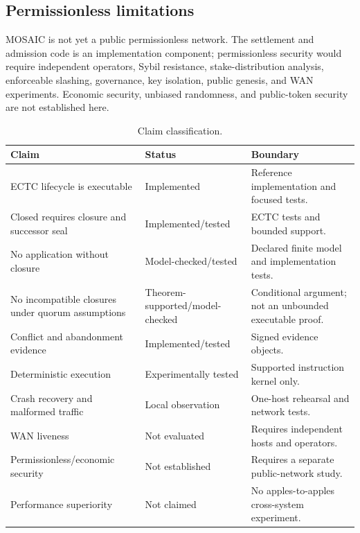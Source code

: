 \documentclass{ledger}
\begin{document}
\subsection{Permissionless limitations}
MOSAIC is not yet a public permissionless network. The settlement and admission code is an implementation component; permissionless security would require independent operators, Sybil resistance, stake-distribution analysis, enforceable slashing, governance, key isolation, public genesis, and WAN experiments. Economic security, unbiased randomness, and public-token security are not established here.

\begin{table}[h]
\centering
\caption{Claim classification.}
\label{tab:claims}
\begin{tabularx}{\textwidth}{p{5.0cm}p{2.6cm}X}
\toprule
Claim & Status & Boundary \\
\midrule
ECTC lifecycle is executable & Implemented & Reference implementation and focused tests. \\
Closed requires closure and successor seal & Implemented/tested & ECTC tests and bounded support. \\
No application without closure & Model-checked/tested & Declared finite model and implementation tests. \\
No incompatible closures under quorum assumptions & Theorem-supported/model-checked & Conditional argument; not an unbounded executable proof. \\
Conflict and abandonment evidence & Implemented/tested & Signed evidence objects. \\
Deterministic execution & Experimentally tested & Supported instruction kernel only. \\
Crash recovery and malformed traffic & Local observation & One-host rehearsal and network tests. \\
WAN liveness & Not evaluated & Requires independent hosts and operators. \\
Permissionless/economic security & Not established & Requires a separate public-network study. \\
Performance superiority & Not claimed & No apples-to-apples cross-system experiment. \\
\bottomrule
\end{tabularx}
\end{table}
\end{document}
